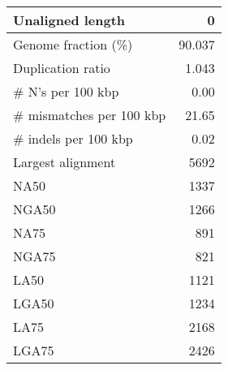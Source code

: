 \documentclass[12pt,a4paper]{article}
\begin{document}
\begin{table}[ht]
\begin{center}
\begin{tabular}{|l*{1}{|r}|}
Unaligned length & 0 \\ \hline
Genome fraction (\%) & 90.037 \\ \hline
Duplication ratio & 1.043 \\ \hline
\# N's per 100 kbp & 0.00 \\ \hline
\# mismatches per 100 kbp & 21.65 \\ \hline
\# indels per 100 kbp & 0.02 \\ \hline
Largest alignment & 5692 \\ \hline
NA50 & 1337 \\ \hline
NGA50 & 1266 \\ \hline
NA75 & 891 \\ \hline
NGA75 & 821 \\ \hline
LA50 & 1121 \\ \hline
LGA50 & 1234 \\ \hline
LA75 & 2168 \\ \hline
LGA75 & 2426 \\ \hline
\end{tabular}
\end{center}
\end{table}
\end{document}

